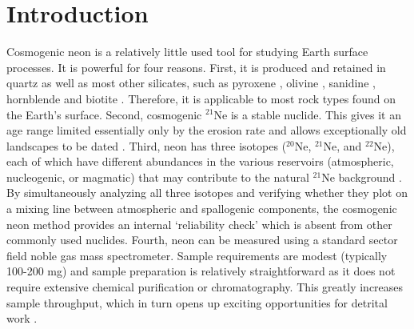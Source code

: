 \documentclass[authoryear,review,12pt]{elsarticle}
\begin{document}
\section{Introduction}
Cosmogenic neon is a relatively little used tool for studying Earth
surface processes. It is powerful for four reasons.  First, it is
produced and retained in quartz \citep{niedermann1993, niedermann1994,
  shuster2005b} as well as most other silicates, such as pyroxene
\citep{schaefer1999}, olivine \citep{poreda1992}, sanidine
\citep{kober2005}, hornblende and biotite
\citep{amidon2012}. Therefore, it is applicable to most rock types
found on the Earth's surface.  Second, cosmogenic $^{21}$Ne is a
stable nuclide. This gives it an age range limited essentially only by
the erosion rate and allows exceptionally old landscapes to be dated
\citep{schaefer1999, dunai2005}.  Third, neon has three isotopes
($^{20}$Ne, $^{21}$Ne, and $^{22}$Ne), each of which have different
abundances in the various reservoirs (atmospheric, nucleogenic, or
magmatic) that may contribute to the natural $^{21}$Ne background
\citep{niedermann2002}.  By simultaneously analyzing all three
isotopes and verifying whether they plot on a mixing line between
atmospheric and spallogenic components, the cosmogenic neon method
provides an internal `reliability check' which is absent from other
commonly used nuclides. Fourth, neon can be measured using a standard
sector field noble gas mass spectrometer. Sample requirements are
modest (typically 100-200 mg) and sample preparation is relatively
straightforward as it does not require extensive chemical purification
or chromatography. This greatly increases sample throughput, which in
turn opens up exciting opportunities for detrital work
\citep{dunai2005, codilean2008}.\\
\end{document}
